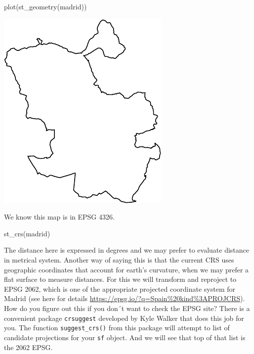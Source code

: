 \documentclass[
  krantz2]{krantz}
\makeatletter
\newenvironment{Shaded}{\begin{snugshade}}{\end{snugshade}}
\newcommand{\FunctionTok}[1]{\textcolor[rgb]{0,0,0}{#1}}
\newcommand{\NormalTok}[1]{#1}
\newenvironment{kframe}{%
\medskip{}
\setlength{\fboxsep}{.8em}
 \def\at@end@of@kframe{}%
 \ifinner\ifhmode%
  \def\at@end@of@kframe{\end{minipage}}%
  \begin{minipage}{\columnwidth}%
 \fi\fi%
 \def\FrameCommand##1{\hskip\@totalleftmargin \hskip-\fboxsep
 \colorbox{shadecolor}{##1}\hskip-\fboxsep
     \hskip-\linewidth \hskip-\@totalleftmargin \hskip\columnwidth}%
 \MakeFramed {\advance\hsize-\width
   \@totalleftmargin\z@ \linewidth\hsize
   \@setminipage}}%
 {\par\unskip\endMakeFramed%
 \at@end@of@kframe}
\renewenvironment{Shaded}{\begin{kframe}}{\end{kframe}}
\makeatother
\begin{document}
\begin{Shaded}
\begin{Highlighting}[]
\FunctionTok{plot}\NormalTok{(}\FunctionTok{st\_geometry}\NormalTok{(madrid))}
\end{Highlighting}
\end{Shaded}

\includegraphics{crime_mapping_files/figure-latex/unnamed-chunk-65-1.pdf}

We know this map is in EPSG 4326.

\begin{Shaded}
\begin{Highlighting}[]
\FunctionTok{st\_crs}\NormalTok{(madrid)}
\end{Highlighting}
\end{Shaded}

The distance here is expressed in degrees and we may prefer to evaluate distance in metrical system. Another way of saying this is that the current CRS uses geographic coordinates that account for earth's curvature, when we may prefer a flat surface to measure distances. For this we will transform and reproject to EPSG 2062, which is one of the appropriate projected coordinate system for Madrid (see here for details \url{https://epsg.io/?q=Spain\%20kind\%3APROJCRS}). How do you figure out this if you don´t want to check the EPSG site? There is a convenient package \texttt{crsuggest} developed by Kyle Walker that does this job for you. The function \texttt{suggest\_crs()} from this package will attempt to list of candidate projections for your \texttt{sf} object. And we will see that top of that list is the 2062 EPSG.
\end{document}
